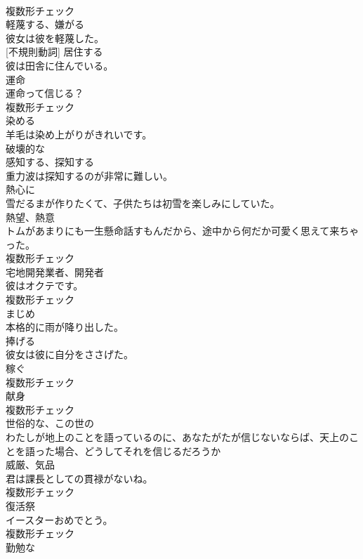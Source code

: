 \documentclass[8pt]{extreport}
\begin{document}
\begin{CJK}{UTF8}{min}
\\	複数形チェック
\\	[動詞]	軽蔑する、嫌がる	
\\	彼女は彼を軽蔑した。	
\\	[動詞] [不規則動詞]	居住する	
\\	彼は田舎に住んでいる。	
\\	[名詞]	運命	
\\	運命って信じる？	
\\	複数形チェック
\\	[動詞]	染める	
\\	羊毛は染め上がりがきれいです。	
\\	[形容詞]	破壊的な	
\\	[動詞]	感知する、探知する	
\\	重力波は探知するのが非常に難しい。	
\\	[副詞]	熱心に	
\\	雪だるまが作りたくて、子供たちは初雪を楽しみにしていた。	
\\	[名詞]	熱望、熱意	
\\	トムがあまりにも一生懸命話すもんだから、途中から何だか可愛く思えて来ちゃった。	
\\	複数形チェック
\\	[名詞]	宅地開発業者、開発者	
\\	彼はオクテです。	
\\	複数形チェック
\\	[形容詞]	まじめ	
\\	本格的に雨が降り出した。	
\\	[動詞]	捧げる	
\\	彼女は彼に自分をささげた。	
\\	[名詞]	稼ぐ	
\\	複数形チェック
\\	[名詞]	献身	
\\	複数形チェック
\\	[形容詞]	世俗的な、この世の	
\\	わたしが地上のことを語っているのに、あなたがたが信じないならば、天上のことを語った場合、どうしてそれを信じるだろうか	
\\	[名詞]	威厳、気品	
\\	君は課長としての貫禄がないね。	
\\	複数形チェック
\\	[名詞]	復活祭	
\\	イースターおめでとう。	
\\	複数形チェック
\\	[形容詞]	勤勉な	

\end{CJK}
\end{document}
